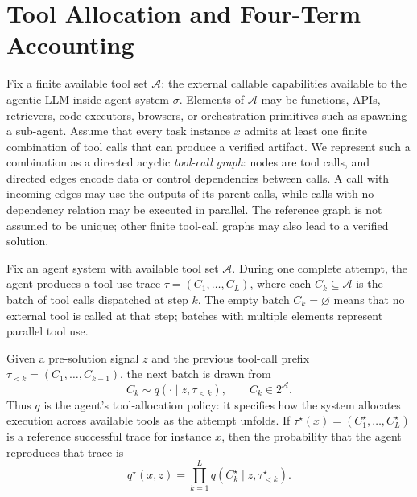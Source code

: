 \section{Tool Allocation and Four-Term Accounting}
\label{sec:tool-accounting}

\begin{definition}[To be decided]
\label{def:reference-tools}
Fix a finite available tool set \(\mathcal A\): the external callable
capabilities available to the agentic LLM inside agent system \(\sigma\).
Elements of \(\mathcal A\) may be functions, APIs, retrievers, code executors,
browsers, or orchestration primitives such as spawning a sub-agent. Assume that
every task instance \(x\) admits at least one finite combination of tool calls
that can produce a verified artifact. We represent such a combination as a
directed acyclic \emph{tool-call graph}: nodes are tool calls, and directed
edges encode data or control dependencies between calls. A call with incoming
edges may use the outputs of its parent calls, while calls with no dependency
relation may be executed in parallel. The reference graph is not assumed to be
unique; other finite tool-call graphs may also lead to a verified solution.


\end{definition}

\begin{definition}
\label{def:tool-policy}
Fix an agent system with available tool set \(\mathcal A\). During one complete
attempt, the agent produces a tool-use trace
\(\tau=(C_1,\ldots,C_L)\), where each \(C_k\subseteq\mathcal A\) is the batch of
tool calls dispatched at step \(k\). The empty batch \(C_k=\varnothing\) means
that no external tool is called at that step; batches with multiple elements
represent parallel tool use.

Given a pre-solution signal \(z\) and the previous tool-call prefix
\(\tau_{<k}=(C_1,\ldots,C_{k-1})\), the next batch is drawn from
\[
C_k\sim q(\cdot\mid z,\tau_{<k}),
\qquad
C_k\in 2^{\mathcal A}.
\]
Thus \(q\) is the agent's tool-allocation policy: it specifies how the system
allocates execution across available tools as the attempt unfolds. If
\(\tau^\star(x)=(C_1^\star,\ldots,C_L^\star)\) is a reference successful trace
for instance \(x\), then the probability that the agent reproduces that trace is
\[
q^\star(x,z)
=
\prod_{k=1}^{L}
q\!\left(C_k^\star\mid z,\tau^\star_{<k}\right).
\]
\end{definition}

